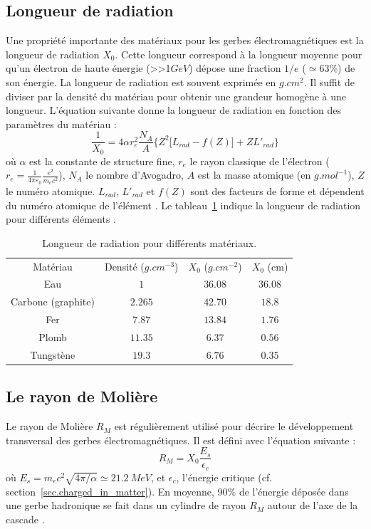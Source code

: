 \subsection{Longueur de radiation}
\label{sec.x0}
Une propriété importante des matériaux pour les gerbes électromagnétiques est la longueur de radiation $X_0$. Cette longueur correspond à la longueur moyenne pour qu'un électron de haute énergie (>>1$GeV$) dépose une fraction $1/e$ ($\simeq 63\%$) de son énergie. La longueur de radiation est souvent exprimée en $g.cm^2$. Il suffit de diviser par la densité du matériau pour obtenir une grandeur homogène à une longueur. L'équation suivante donne la longueur de radiation en fonction des paramètres du matériau \cite{pdg}: 
\begin{equation}
  \frac{1}{X_0}=4\alpha r_e^2\frac{N_A}{A}\big\{Z^2\big[L_{rad}-f(Z)\big]+ZL'_{rad}\big\}
  \label{eq.x0}
\end{equation}
où $\alpha$ est la constante de structure fine, $r_e$ le rayon classique de l'électron ($r_e=\frac{1}{4\pi\varepsilon_0}\frac{e^2}{m_ec^2}$), $N_A$ le nombre d'Avogadro, $A$ est la masse atomique (en $g.mol^{-1}$), $Z$ le numéro atomique. $L_{rad}$, $L'_{rad}$ et $f(Z)$ sont des facteurs de forme et dépendent du numéro atomique de l'élément \cite{tsai}. Le tableau~\ref{tab.x0} indique la longueur de radiation pour différents éléments \cite{pdg}.
\begin{table}[!ht]
  \begin{center}
    \begin{tabular}{c|c|c|c}
      \rowcolor{black!20!white}Matériau & Densité ($g.cm^{-3}$) & $X_0$ ($g.cm^{-2}$) & $X_0$ (cm)\\
      \rowcolor{black!5!white}\hline
      \rowcolor{black!5!white}Eau & $1$ & $36.08$ & $36.08$ \\
      \rowcolor{black!5!white}Carbone (graphite) & $2.265$ & $42.70$ & $18.8$\\
      \rowcolor{black!5!white}Fer & $7.87$ & $13.84$ & $1.76$\\
      \rowcolor{black!5!white}Plomb & $11.35$ & $6.37$ & $0.56$\\
      \rowcolor{black!5!white}Tungstène & $19.3$ & $6.76$ & $0.35$
    \end{tabular}
  \end{center}  
  \caption{Longueur de radiation pour différents matériaux.}
  \label{tab.x0}
\end{table}

\subsection{Le rayon de Molière}
Le rayon de Molière $R_M$ est régulièrement utilisé pour décrire le développement transversal des gerbes électromagnétiques. Il est défini avec l'équation suivante \cite{pdg}:
\begin{equation}
  R_M=X_0\frac{E_s}{\epsilon_c}
\end{equation}
où $E_s=m_ec^2\sqrt{4\pi/\alpha}\simeq 21.2~MeV$, et $\epsilon_c$, l'énergie critique (cf. section~\ref{sec.charged_in_matter}). En moyenne, 90$\%$ de l'énergie déposée dans une gerbe hadronique se fait dans un cylindre de rayon $R_M$ autour de l'axe de la cascade \cite{wigmans}.

